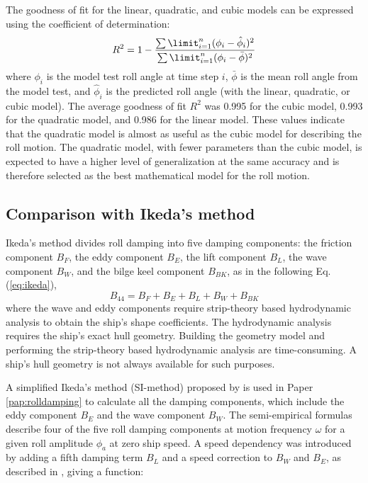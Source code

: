 \noindent The goodness of fit for the linear, quadratic, and cubic models can be expressed using the coefficient of determination:
\begin{equation} \label{eq:R2}
R^2=1-\frac{\sum\limit_{i=1}^{n}(\phi_{i}-\hat{\phi}_i)^2}{\sum\limit_{i=1}^{n}(\phi_i-\bar \phi)^2}
\end{equation}
where $\phi_i$ is the model test roll angle at time step $i$, $\bar \phi$ is the mean roll angle from the model test, and $\hat{\phi}_i$ is the predicted roll angle (with the linear, quadratic, or cubic model). The average goodness of fit $R^2$ was 0.995 for the cubic model, 0.993 for the quadratic model, and 0.986 for the linear model. These values indicate that the quadratic model is almost as useful as the cubic model for describing the roll motion. The quadratic model, with fewer parameters than the cubic model, is expected to have a higher level of generalization at the same accuracy and is therefore selected as the best mathematical model for the roll motion. 

\subsection{Comparison with Ikeda's method}
Ikeda's method divides roll damping into five damping components: the friction component $B_F$, the eddy component $B_E$, the lift component $B_L$, the wave component $B_W$, and the bilge keel component $B_{BK}$, as in the following Eq.(\ref{eq:ikeda}), 
\begin{equation} \label{eq:ikeda}
B_{44} = B_F + B_E + B_L + B_W + B_{BK}
\end{equation}
where the wave and eddy components require strip-theory based hydrodynamic analysis to obtain the ship's shape coefficients. The hydrodynamic analysis requires the ship's exact hull geometry. Building the geometry model and performing the strip-theory based hydrodynamic analysis are time-consuming. A ship's hull geometry is not always available for such purposes. 

A simplified Ikeda's method (SI-method) proposed by \parencite{kawahara_simple_2011} is used in Paper \ref{pap:rolldamping} to calculate all the damping components, which include the eddy component $B_E$ and the wave component $B_W$. The semi-empirical formulas describe four of the five roll damping components at motion frequency $\omega$ for a given roll amplitude $\phi_a$ at zero ship speed. A speed dependency was introduced by adding a fifth damping term $B_L$ and a speed correction to $B_W$ and $B_E$, as described in \parencite{ikeda_velocity_1979}, giving a function: 


